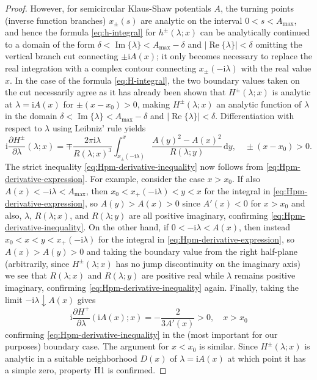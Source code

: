 \documentclass[12pt]{amsart}
\numberwithin{equation}{section}
\newcommand{\dd}{\mathrm{d}}
\newcommand{\ii}{\mathrm{i}}
\newcommand{\SP}{\lambda}
\DeclareMathOperator{\imag}{Im}
\DeclareMathOperator{\re}{Re}
\begin{document}
\begin{proof}
However, for semicircular Klaus-Shaw potentials $A$, the turning points (inverse function branches) $x_\pm(s)$ are analytic on the interval $0<s<A_\mathrm{max}$, and hence the formula \eqref{eq:h-integral} for $h^\pm(\SP;x)$ can be analytically continued to a domain of the form $\delta<\imag\{\SP\}<A_\mathrm{max}-\delta$ and $|\re\{\SP\}|<\delta$ omitting the vertical branch cut connecting $\pm \ii A(x)$; it only becomes necessary to replace the real integration with a complex contour connecting $x_\pm(-\ii\SP)$ with the real value $x$.  In the case of the formula \eqref{eq:H-integral}, the two boundary values taken on the cut necessarily agree as it has already been shown that $H^\pm(\SP;x)$ is analytic at $\SP=\ii A(x)$ for $\pm(x-x_0)>0$, making $H^\pm(\SP;x)$ an analytic function of $\SP$ in the domain $\delta<\imag\{\SP\}<A_\mathrm{max}-\delta$ and $|\re\{\SP\}|<\delta$.
Differentiation with respect to $\SP$ using Leibniz' rule yields
\begin{equation}
\ii\frac{\partial H^\pm}{\partial\SP}(\SP;x)=\mp\frac{2\pi \ii\SP}{R(\SP;x)^3}\int_{x_\pm(-\ii\SP)}^x
\frac{A(y)^2-A(x)^2}{R(\SP;y)}\,\dd y,\quad \pm (x-x_0)>0.
\label{eq:Hpm-derivative-expression}
\end{equation}
The strict inequality \eqref{eq:Hpm-derivative-inequality} now follows from \eqref{eq:Hpm-derivative-expression}.  For example, consider the case $x>x_0$.  If also $A(x)<-\ii\SP<A_\mathrm{max}$, then $x_0<x_+(-\ii\SP)<y<x$ for the integral in \eqref{eq:Hpm-derivative-expression}, so $A(y)>A(x)>0$ since $A'(x)<0$ for $x>x_0$ and also, $\SP$, $R(\SP;x)$, and $R(\SP;y)$ are all positive imaginary, confirming \eqref{eq:Hpm-derivative-inequality}.  On the other hand, if $0<-\ii\SP<A(x)$, then instead $x_0<x<y<x_+(-\ii\SP)$ for the integral in \eqref{eq:Hpm-derivative-expression}, so $A(x)>A(y)>0$ and taking the boundary value from the right half-plane (arbitrarily, since $H^\pm(\SP;x)$ has no jump discontinuity on the imaginary axis) we see that $R(\SP;x)$ and $R(\SP;y)$ are positive real while $\SP$ remains positive imaginary, confirming \eqref{eq:Hpm-derivative-inequality} again.  Finally, taking the limit $-\ii\SP\downarrow A(x)$ gives
\begin{equation}
\ii\frac{\partial H^+}{\partial\SP}(\ii A(x);x)=-\frac{2}{3A'(x)}>0,\quad x>x_0
\end{equation}
confirming \eqref{eq:Hpm-derivative-inequality} in the (most important for our purposes) boundary case.  The argument for $x<x_0$ is similar.  Since $H^\pm(\SP;x)$ is analytic in a suitable neighborhood $D(x)$ of $\SP=\ii A(x)$ at which point it has a simple zero, property H1 is confirmed.


\end{proof}
\end{document}
